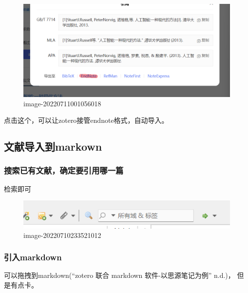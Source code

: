 \begin{figure}
\centering
\includegraphics{zotero基础使用.assets/image-20220711001056018.png}
\caption{image-20220711001056018}
\end{figure}

点击这个，可以让zotero接管endnote格式，自动导入。

\hypertarget{ux6587ux732eux5bfcux5165ux5230markown}{%
\subsection{文献导入到markown}\label{ux6587ux732eux5bfcux5165ux5230markown}}

\hypertarget{ux641cux7d22ux5df2ux6709ux6587ux732eux786eux5b9aux8981ux5f15ux7528ux54eaux4e00ux7bc7}{%
\subsubsection{搜索已有文献，确定要引用哪一篇}\label{ux641cux7d22ux5df2ux6709ux6587ux732eux786eux5b9aux8981ux5f15ux7528ux54eaux4e00ux7bc7}}

检索即可

\begin{figure}
\centering
\includegraphics{zotero基础使用.assets/image-20220710233521012.png}
\caption{image-20220710233521012}
\end{figure}

\hypertarget{ux5f15ux5165markdown}{%
\subsubsection{引入markdown}\label{ux5f15ux5165markdown}}

可以拖拽到markdown({``zotero 联合 markdown 软件-以思源笔记为例''}
n.d.)， 但是有点卡。

